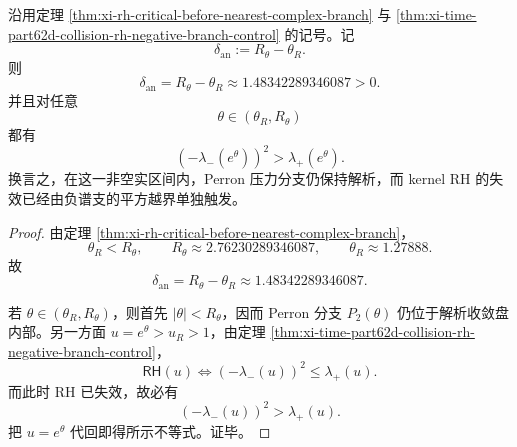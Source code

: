 \begin{corollary}\label{cor:xi-time-part62d-analytic-nonrh-window-length}
沿用定理 \ref{thm:xi-rh-critical-before-nearest-complex-branch} 与
\ref{thm:xi-time-part62d-collision-rh-negative-branch-control} 的记号。记
\[
\delta_{\mathrm{an}}:=R_\theta-\theta_R.
\]
则
\[
\delta_{\mathrm{an}}
=
R_\theta-\theta_R
\approx
1.48342289346087>0.
\]
并且对任意
\[
\theta\in(\theta_R,R_\theta)
\]
都有
\[
(-\lambda_-(e^\theta))^2>\lambda_+(e^\theta).
\]
换言之，在这一非空实区间内，Perron 压力分支仍保持解析，而 kernel RH 的失效已经由负谱支的平方越界单独触发。
\end{corollary}
\begin{proof}
由定理 \ref{thm:xi-rh-critical-before-nearest-complex-branch}，
\[
\theta_R<R_\theta,
\qquad
R_\theta\approx 2.76230289346087,
\qquad
\theta_R\approx 1.27888.
\]
故
\[
\delta_{\mathrm{an}}=R_\theta-\theta_R\approx 1.48342289346087.
\]

若 \(\theta\in(\theta_R,R_\theta)\)，则首先 \(|\theta|<R_\theta\)，因而 Perron 分支 \(P_2(\theta)\) 仍位于解析收敛盘内部。另一方面 \(u=e^\theta>\!u_R>1\)，由定理 \ref{thm:xi-time-part62d-collision-rh-negative-branch-control}，
\[
\textsf{RH}(u)\iff (-\lambda_-(u))^2\le \lambda_+(u).
\]
而此时 RH 已失效，故必有
\[
(-\lambda_-(u))^2>\lambda_+(u).
\]
把 \(u=e^\theta\) 代回即得所示不等式。证毕。
\end{proof}

